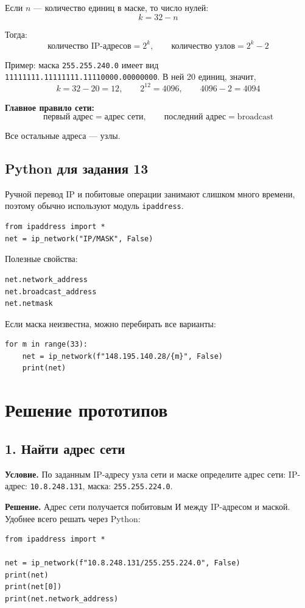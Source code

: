 \documentclass[11pt]{article}
\begin{document}
Если $n$ --- количество единиц в маске, то число нулей:
\[
k = 32 - n
\]

Тогда:
\[
\text{количество IP-адресов} = 2^k, \qquad \text{количество узлов} = 2^k - 2
\]

Пример: маска \texttt{255.255.240.0} имеет вид \texttt{11111111.11111111.11110000.00000000}. В ней 20 единиц, значит,
\[
k = 32 - 20 = 12, \qquad 2^{12} = 4096, \qquad 4096 - 2 = 4094
\]

\textbf{Главное правило сети:}
\[
\text{первый адрес} = \text{адрес сети}, \qquad \text{последний адрес} = \text{broadcast}
\]

Все остальные адреса --- узлы.

\subsection*{Python для задания 13}

Ручной перевод IP и побитовые операции занимают слишком много времени, поэтому обычно используют модуль \texttt{ipaddress}.

\begin{verbatim}
from ipaddress import *
net = ip_network("IP/MASK", False)
\end{verbatim}

Полезные свойства:
\begin{verbatim}
net.network_address
net.broadcast_address
net.netmask
\end{verbatim}

Если маска неизвестна, можно перебирать все варианты:
\begin{verbatim}
for m in range(33):
    net = ip_network(f"148.195.140.28/{m}", False)
    print(net)
\end{verbatim}

\section*{Решение прототипов}

\subsection*{1. Найти адрес сети}

\textbf{Условие.} По заданным IP-адресу узла сети и маске определите адрес сети: IP-адрес: \texttt{10.8.248.131}, маска: \texttt{255.255.224.0}.

\textbf{Решение.} Адрес сети получается побитовым И между IP-адресом и маской. Удобнее всего решать через Python:
\begin{verbatim}
from ipaddress import *

net = ip_network(f"10.8.248.131/255.255.224.0", False)
print(net)
print(net[0])
print(net.network_address)
\end{verbatim}
\end{document}
